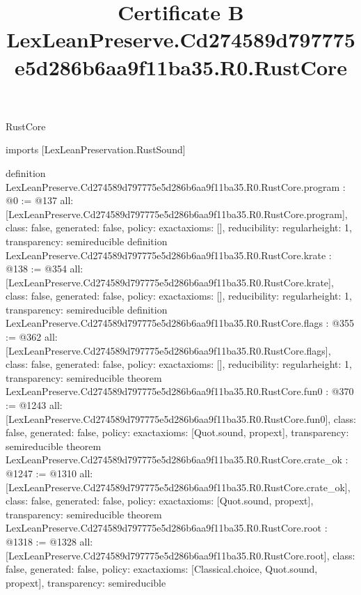 \begin{lexlean}{RustCore}
\title{Certificate B LexLeanPreserve.Cd274589d797775e5d286b6aa9f11ba35.R0.RustCore}
\begin{coremodule}
imports [LexLeanPreservation.RustSound]

definition LexLeanPreserve.Cd274589d797775e5d286b6aa9f11ba35.R0.RustCore.program : @0 := @137 {
  all: [LexLeanPreserve.Cd274589d797775e5d286b6aa9f11ba35.R0.RustCore.program],
  class: false,
  generated: false,
  policy: exact{axioms: []},
  reducibility: regular{height: 1},
  transparency: semireducible
}
definition LexLeanPreserve.Cd274589d797775e5d286b6aa9f11ba35.R0.RustCore.krate : @138 := @354 {
  all: [LexLeanPreserve.Cd274589d797775e5d286b6aa9f11ba35.R0.RustCore.krate],
  class: false,
  generated: false,
  policy: exact{axioms: []},
  reducibility: regular{height: 1},
  transparency: semireducible
}
definition LexLeanPreserve.Cd274589d797775e5d286b6aa9f11ba35.R0.RustCore.flags : @355 := @362 {
  all: [LexLeanPreserve.Cd274589d797775e5d286b6aa9f11ba35.R0.RustCore.flags],
  class: false,
  generated: false,
  policy: exact{axioms: []},
  reducibility: regular{height: 1},
  transparency: semireducible
}
theorem LexLeanPreserve.Cd274589d797775e5d286b6aa9f11ba35.R0.RustCore.fun0 : @370 := @1243 {
  all: [LexLeanPreserve.Cd274589d797775e5d286b6aa9f11ba35.R0.RustCore.fun0],
  class: false,
  generated: false,
  policy: exact{axioms: [Quot.sound, propext]},
  transparency: semireducible
}
theorem LexLeanPreserve.Cd274589d797775e5d286b6aa9f11ba35.R0.RustCore.crate_ok : @1247 := @1310 {
  all: [LexLeanPreserve.Cd274589d797775e5d286b6aa9f11ba35.R0.RustCore.crate_ok],
  class: false,
  generated: false,
  policy: exact{axioms: [Quot.sound, propext]},
  transparency: semireducible
}
theorem LexLeanPreserve.Cd274589d797775e5d286b6aa9f11ba35.R0.RustCore.root : @1318 := @1328 {
  all: [LexLeanPreserve.Cd274589d797775e5d286b6aa9f11ba35.R0.RustCore.root],
  class: false,
  generated: false,
  policy: exact{axioms: [Classical.choice, Quot.sound, propext]},
  transparency: semireducible
}


\end{coremodule}
\end{lexlean}
